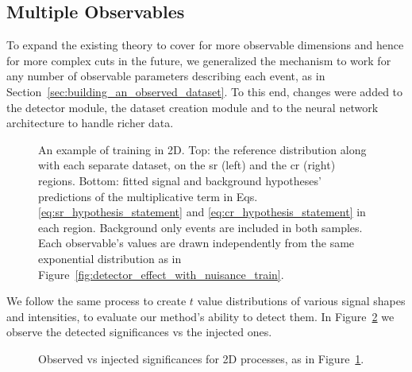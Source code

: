 \documentclass[paper/ddppaper2.tex]{subfiles}
\begin{document}
\subsection{Multiple Observables}

To expand the existing theory to cover for more observable dimensions and hence for more complex cuts in the future, we generalized the mechanism to work for any number of observable parameters describing each event, as in Section~\ref{sec:building_an_observed_dataset}. To this end, changes were added to the detector module, the dataset creation module and to the neural network architecture to handle richer data.

\begin{figure}
    \caption{An example of training in 2D. Top: the reference distribution along with each separate dataset, on the \gls{sr} (left) and the \gls{cr} (right) regions. Bottom: fitted signal and background hypotheses' predictions of the multiplicative term in Eqs.\ref{eq:sr_hypothesis_statement} and \ref{eq:cr_hypothesis_statement} in each region. Background only events are included in both samples. Each observable's values are drawn independently from the same exponential distribution as in Figure~\ref{fig:detector_effect_with_nuisance_train}.}
    \label{fig:2d_train}
\end{figure}


We follow the same process to create $t$ value distributions of various signal shapes and intensities, to evaluate our method's ability to detect them. In Figure~\ref{fig:2d_significances} we observe the detected significances vs the injected ones.

\begin{figure}
    \caption{Observed vs injected significances for 2D processes, as in Figure~\ref{fig:2d_train}.}
    \label{fig:2d_significances}
\end{figure}
\end{document}
